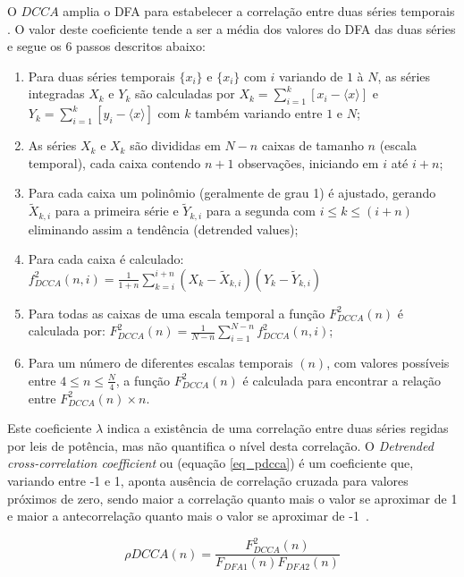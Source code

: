 O \(DCCA\) amplia o DFA para estabelecer a correlação entre duas séries temporais \cite{Podobnik2008}. O valor deste coeficiente tende a ser a média dos valores do DFA das duas séries e segue os 6 passos descritos abaixo:

\begin{enumerate}
  \label{list:dcca}
  \item Para duas séries temporais \(\{x_{i}\}\) e \(\{x_{i}\}\) com  \(i\) variando de  \(1\) à \(N\), as séries integradas \(X_{k}\) e \(Y_{k}\) são calculadas por \(X_{k} = \sum_{i=1}^{k}\left[x_{i} - \langle x \rangle \right] \) e \(Y_{k} = \sum_{i=1}^{k}\left[y_{i} - \langle x \rangle \right] \) com \(k\) também variando entre \(1\) e \(N\);
  \item As séries  \(X_{k}\) e \(X_{k}\) são divididas em \(N - n\) caixas de tamanho \(n\) (escala temporal), cada caixa contendo \(n + 1\) observações, iniciando em \(i\) até \(i + n\);
  \item Para cada caixa um polinômio (geralmente de grau 1) é ajustado, gerando \(\widetilde{X}_{k, i}\) para a primeira série e \(\widetilde{Y}_{k, i}\) para a segunda com \( i \le k \le (i + n) \) eliminando assim a tendência (detrended values);
  \item  Para cada caixa é calculado: $f_{DCCA}^{2}(n, i) = \frac{1}{1+n} \sum_{k=i}^{i + n}(X_{k}-\widetilde{X}_{k, i})(Y_{k}-\widetilde{Y}_{k, i})$
  \item Para todas as caixas de uma escala temporal a função $F_{DCCA}^{2}(n)$ é calculada por: $F_{DCCA}^{2}(n) = \frac{1}{N-n} \sum_{i=1}^{N-n} f_{DCCA}^{2}(n, i)$;
  \item Para um número de diferentes escalas temporais $(n)$, com valores possíveis entre \( 4 \le n \le \frac{N}{4}\), a função $F_{DCCA}^{2}(n)$ é calculada para encontrar a relação entre $F_{DCCA}^{2}(n) \times n$.
\end{enumerate}


Este coeficiente \(\lambda\) indica a existência de uma correlação entre duas séries regidas por leis de potência, mas não quantifica o nível desta correlação. O \emph{Detrended cross-correlation coefficient} ou \pdcca (equação \ref{eq_pdcca}) é um coeficiente que, variando entre -1 e 1, aponta ausência de correlação cruzada para valores próximos de zero, sendo maior a correlação quanto mais o valor se aproximar de 1 e maior a antecorrelação quanto mais o valor se aproximar de -1~\cite{Zebende2011}. 

\begin{equation}
\label{eq_pdcca}
\rho DCCA(n) = \frac{F_{DCCA}^2 (n)}{ F_{DFA1} (n) F_{DFA2} (n)}
\end{equation}

